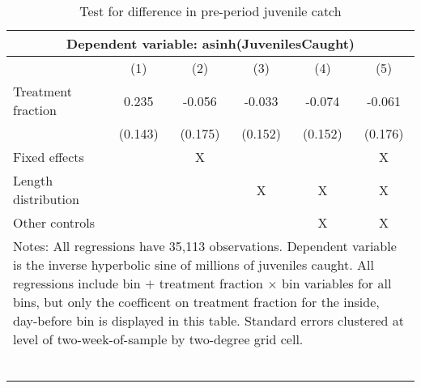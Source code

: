 \begin{table}[tb]
\centering
\caption{Test for difference in pre-period juvenile catch} 
\label{preperiod_juvenilecatch}
\begin{tabular}{lccccc}
   \toprule \multicolumn{6}{c}{Dependent variable: asinh(JuvenilesCaught)} \\ \midrule  & (1) & (2) & (3) & (4) & (5) \\ 
    \midrule Treatment fraction & 0.235 & -0.056 & -0.033 & -0.074 & -0.061 \\ 
   & (0.143) & (0.175) & (0.152) & (0.152) & (0.176) \\ 
    \midrule Fixed effects & & X & & & X\\  Length distribution & & & X & X & X \\ Other controls & & & & X & X \\ \bottomrule \multicolumn{6}{l}{\multirow{2}{12cm}{Notes: All regressions have 35,113 observations. Dependent variable is the inverse hyperbolic sine of millions of juveniles caught. All regressions include bin $+$ treatment fraction $\times$ bin variables for all bins, but only the coefficent on treatment fraction for the inside, day-before bin is displayed in this table. Standard errors clustered at level of two-week-of-sample by two-degree grid cell.}} \\\\\\\\\\\\\\\\ \end{tabular}
\end{table}
